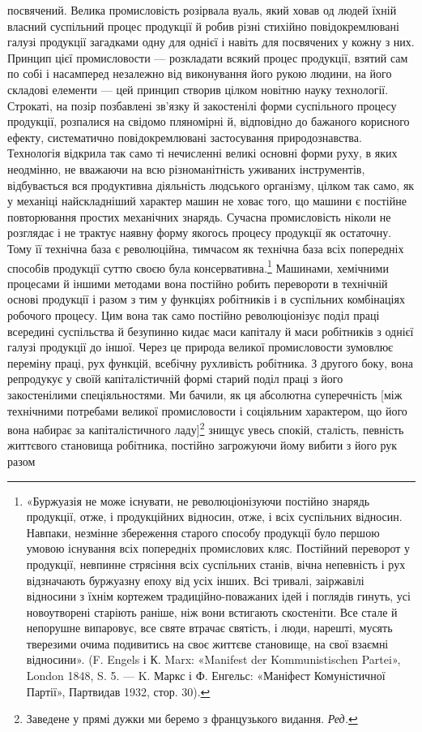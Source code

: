 посвячений. Велика промисловість розірвала вуаль, який ховав
од людей їхній власний суспільний процес продукції й робив
різні стихійно повідокремлювані галузі продукції загадками
одну для однієї і навіть для посвячених у кожну з них. Принцип
цієї промисловости — розкладати всякий процес продукції, взятий
сам по собі і насамперед незалежно від виконування його
рукою людини, на його складові елементи — цей принцип створив
цілком новітню науку технології. Строкаті, на позір позбавлені
зв’язку й закостенілі форми суспільного процесу продукції,
розпалися на свідомо пляномірні й, відповідно до бажаного корисного
ефекту, систематично повідокремлювані застосування
природознавства. Технологія відкрила так само ті нечисленні
великі основні форми руху, в яких неодмінно, не вважаючи на
всю різноманітність уживаних інструментів, відбувається вся
продуктивна діяльність людського організму, цілком так само,
як у механіці найскладніший характер машин не ховає того,
що машини є постійне повторювання простих механічних знарядь.
Сучасна промисловість ніколи не розглядає і не трактує наявну
форму якогось процесу продукції як остаточну. Тому її технічна
база є революційна, тимчасом як технічна база всіх попередніх
способів продукції суттю своєю була консервативна.\footnote{
«Буржуазія не може існувати, не революціонізуючи постійно
знарядь продукції, отже, і продукційних відносин, отже, і всіх суспільних
відносин. Навпаки, незмінне збереження старого способу продукції було
першою умовою існування всіх попередніх промислових кляс. Постійний
переворот у продукції, невпинне стрясіння всіх суспільних станів, вічна
непевність і рух відзначають буржуазну епоху від усіх інших. Всі тривалі,
заіржавілі відносини з їхнім кортежем традиційно-поважаних ідей і
поглядів гинуть, усі новоутворені старіють раніше, ніж вони встигають
скостеніти. Все стале й непорушне випаровує, все святе втрачає святість,
і люди, нарешті, мусять тверезими очима подивитись на своє життєве
становище, на свої взаємні відносини». (F. Engels і К. Marx: «Manifest
der Kommunistischen Partei», London 1848, S. 5. — K. Маркс
і Ф. Енгельс: «Маніфест Комуністичної Партії», Партвидав 1932, стор. 30).
} Машинами,
хемічними процесами й іншими методами вона постійно
робить перевороти в технічній основі продукції і разом з тим
у функціях робітників і в суспільних комбінаціях робочого процесу.
Цим вона так само постійно революціонізує поділ праці
всередині суспільства й безупинно кидає маси капіталу й маси
робітників з однієї галузі продукції до іншої. Через це природа
великої промисловости зумовлює переміну праці, рух функцій,
всебічну рухливість робітника. З другого боку, вона репродукує
у своїй капіталістичній формі старий поділ праці з його закостенілими
спеціяльностями. Ми бачили, як ця абсолютна суперечність
[між технічними потребами великої промисловости і соціяльним
характером, що його вона набирає за капіталістичного ладу]\footnote*{
Заведене у прямі дужки ми беремо з французького видання. \emph{Ред.}
}
знищує увесь спокій, сталість, певність життєвого становища
робітника, постійно загрожуючи йому вибити з його рук разом